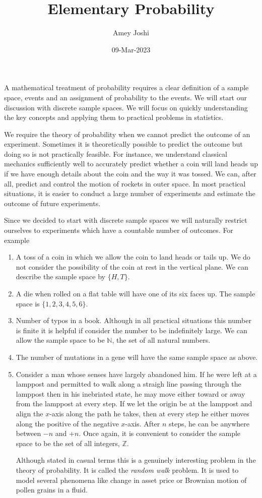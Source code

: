 \documentclass{article}
\title{Elementary Probability}
\date{09-Mar-2023}
\author{Amey Joshi}
\begin{document}
\maketitle
A mathematical treatment of probability requires a clear definition of a
sample space, events and an assignment of probability to the events. We
will start our discussion with discrete sample spaces. We will focus on
quickly understanding the key concepts and applying them to practical 
problems in statistics.

We require the theory of probability when we cannot predict the outcome of
an experiment. Sometimes it is theoretically possible to predict the 
outcome but doing so is not practically feasible. For instance, we 
understand classical mechanics sufficiently well to accurately predict 
whether a coin will land heads up if we have enough details about the coin
and the way it was tossed. We can, after all, predict and control the 
motion of rockets in outer space. In most practical situations, it is
easier to conduct a large number of experiments and estimate the outcome of
future experiments.

Since we decided to start with discrete sample spaces we will naturally 
restrict ourselves to experiments which have a countable number of 
outcomes. For example
\begin{enumerate}
\item A toss of a coin in which we allow the coin to land heads or tails 
up. We do not consider the possibility of the coin at rest in the vertical
plane. We can describe the sample space by $\{H, T\}$.
\item A die when rolled on a flat table will have one of its six faces up.
The sample space is $\{1, 2, 3, 4, 5, 6\}$.
\item Number of typos in a book. Although in all practical situations this
number is finite it is helpful if consider the number to be indefinitely
large. We can allow the sample space to be $\mathbb{N}$, the set of all
natural numbers.
\item The number of mutations in a gene will have the same sample space
as above.
\item Consider a man whose senses have largely abandoned him. If he were
left at a lamppost and permitted to walk along a straigh line passing 
through the lamppost then in his inebriated state, he may move either
toward or away from the lamppost at every step. If we let the origin be
at the lamppost and align the $x$-axis along the path he takes, then at
every step he either moves along the positive of the negative $x$-axis.
After $n$ steps, he can be anywhere between $-n$ and $+n$. Once again, it
is convenient to consider the sample space to be the set of all integers,
$\mathbb{Z}$.

Although stated in casual terms this is a genuinely interesting problem in
the theory of probability. It is called the \emph{random walk} problem. It
is used to model several phenomena like change in asset price or Brownian
motion of pollen grains in a fluid. 
\end{enumerate}
\end{document}
